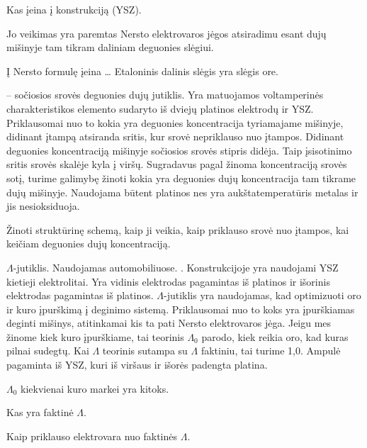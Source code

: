 \begin{remember}
  \item Kas įeina į konstrukciją (YSZ).
  \item Jo veikimas yra paremtas Nersto elektrovaros jėgos atsiradimu
    esant dujų mišinyje tam tikram daliniam deguonies slėgiui.
  \item Į Nersto formulę įeina …
    Etaloninis dalinis slėgis yra slėgis ore.
\end{remember}

 – sočiosios srovės deguonies dujų jutiklis. Yra
matuojamos voltamperinės charakteristikos elemento sudaryto iš dviejų
platinos elektrodų ir YSZ. Priklausomai nuo to kokia yra deguonies
koncentracija tyriamajame mišinyje, didinant įtampą atsiranda sritis,
kur srovė nepriklauso nuo įtampos. Didinant deguonies koncentraciją
mišinyje sočiosios srovės stipris didėja. Taip įsisotinimo sritis
srovės skalėje kyla į viršų. Sugradavus pagal žinoma
koncentraciją srovės sotį, turime galimybę žinoti kokia yra
deguonies dujų koncentracija tam tikrame dujų mišinyje.
Naudojama būtent platinos nes yra aukštatemperatūris metalas ir
jis nesioksiduoja.

\begin{remember}
  \item Žinoti struktūrinę  schemą, kaip ji veikia, kaip
    priklauso srovė nuo įtampos, kai keičiam deguonies dujų
    koncentraciją.
\end{remember}

$\Lambda$-jutiklis. Naudojamas automobiliuose. .
Konstrukcijoje yra naudojami YSZ kietieji elektrolitai. Yra vidinis
elektrodas pagamintas iš platinos ir išorinis elektrodas pagamintas iš
platinos. $\Lambda$-jutiklis yra naudojamas, kad optimizuoti oro ir
kuro įpurškimą į deginimo sistemą. Priklausomai nuo to koks yra
įpurškiamas deginti mišinys, atitinkamai kis ta pati Nersto elektrovaros
jėga. Jeigu mes žinome kiek kuro įpurškiame, tai teorinis $\Lambda_{0}$
parodo, kiek reikia oro, kad kuras pilnai sudegtų. Kai $\Lambda$
teorinis sutampa su $\Lambda$ faktiniu, tai turime 1,0. Ampulė
pagaminta iš YSZ, kuri iš viršaus ir išorės padengta platina.

\begin{remember}
  \item $\Lambda_{0}$ kiekvienai kuro markei yra kitoks.
  \item Kas yra faktinė $\Lambda$.
  \item Kaip priklauso elektrovara nuo faktinės $\Lambda$.
\end{remember}

